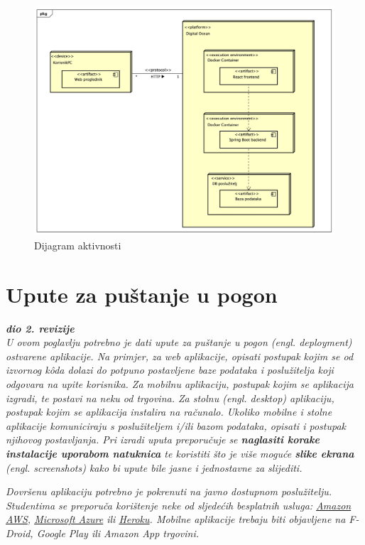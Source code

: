 			\begin{figure}[H]
				\includegraphics[scale=0.28]{dijagrami/dijagram_razmjestaja.jpeg}
				\centering
				\caption{Dijagram aktivnosti}
				\label{fig:bpdiag}
			\end{figure}
			\eject 
		
		\section{Upute za puštanje u pogon}
		
			\textbf{\textit{dio 2. revizije}}\\
		
			 \textit{U ovom poglavlju potrebno je dati upute za puštanje u pogon (engl. deployment) ostvarene aplikacije. Na primjer, za web aplikacije, opisati postupak kojim se od izvornog kôda dolazi do potpuno postavljene baze podataka i poslužitelja koji odgovara na upite korisnika. Za mobilnu aplikaciju, postupak kojim se aplikacija izgradi, te postavi na neku od trgovina. Za stolnu (engl. desktop) aplikaciju, postupak kojim se aplikacija instalira na računalo. Ukoliko mobilne i stolne aplikacije komuniciraju s poslužiteljem i/ili bazom podataka, opisati i postupak njihovog postavljanja. Pri izradi uputa preporučuje se \textbf{naglasiti korake instalacije uporabom natuknica} te koristiti što je više moguće \textbf{slike ekrana} (engl. screenshots) kako bi upute bile jasne i jednostavne za slijediti.}
			
			
			 \textit{Dovršenu aplikaciju potrebno je pokrenuti na javno dostupnom poslužitelju. Studentima se preporuča korištenje neke od sljedećih besplatnih usluga: \href{https://aws.amazon.com/}{Amazon AWS}, \href{https://azure.microsoft.com/en-us/}{Microsoft Azure} ili \href{https://www.heroku.com/}{Heroku}. Mobilne aplikacije trebaju biti objavljene na F-Droid, Google Play ili Amazon App trgovini.}
			
			
			\eject 